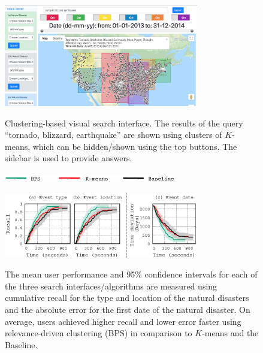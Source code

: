 


\begin{figure}[t]
\begin{centering}
{\includegraphics[width=8.5cm]{imgs/kmeans}}
\par\end{centering}
\caption{Clustering-based visual search interface. The results of the query ``tornado, blizzard, earthquake''  are shown using clusters of $K$-means, which can be hidden/shown using the top buttons. The sidebar is used to provide answers.}
\label{fig:ScreenShot}
\end{figure}


\begin{figure}[t]
\begin{centering}
\includegraphics[width=7.5cm]{imgs/legend3}
\par\end{centering}
\begin{centering}
{\includegraphics[width=8.5cm]{imgs/nd_recall}}
\par\end{centering}
\caption{The mean user performance and 95\% confidence intervals for each of the three search interfaces/algorithms are measured using cumulative recall for the type and location of the natural disasters and the absolute error for the first date of the natural disaster.  On average, users achieved higher recall and lower error faster using relevance-driven clustering (BPS) in comparison to $K$-means and the Baseline.}
\label{fig:UserSurveyRecall}
\end{figure}





